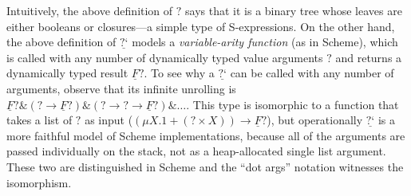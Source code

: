 \documentclass[acmsmall,screen,12pt]{acmart}
\renewcommand{\u}{\underline}
\newcommand{\dynv}{{?}}
\newcommand{\dync}{\u {\text{?`}}}
\newcommand{\with}{\mathbin{\&}}
\begin{document}
\begin{shortonly}
  Intuitively, the above definition of $\dynv$ says that it is a binary
  tree whose leaves are either booleans or closures---a simple type of
  S-expressions.  On the other hand, the above definition of $\dync$
  models a \emph{variable-arity function} (as in Scheme), which is
  called with any number of dynamically typed value arguments $\dynv$
  and returns a dynamically typed result $\u F \dynv$.  To see why a
  $\dync$ can be called with any number of arguments, observe that its
  infinite unrolling is $\u F \dynv \with (\dynv \to \u F \dynv) \with
  (\dynv \to \dynv \to \u F \dynv) \with \ldots$.  This type is
  isomorphic to a function that takes a list of $\dynv$ as input ($(\mu
  X. 1 + (\dynv \times X)) \to \u F \dynv$), but operationally $\dync$
  is a more faithful model of Scheme implementations, because all of the
  arguments are passed individually on the stack, not as a
  heap-allocated single list argument.  These two are distinguished in
  Scheme and the ``dot args'' notation witnesses the isomorphism.
\end{shortonly}
\end{document}
